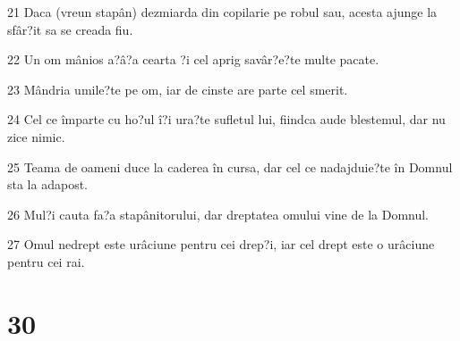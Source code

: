 \par 21 Daca (vreun stapân) dezmiarda din copilarie pe robul sau, acesta ajunge la sfâr?it sa se creada fiu.
\par 22 Un om mânios a?â?a cearta ?i cel aprig savâr?e?te multe pacate.
\par 23 Mândria umile?te pe om, iar de cinste are parte cel smerit.
\par 24 Cel ce împarte cu ho?ul î?i ura?te sufletul lui, fiindca aude blestemul, dar nu zice nimic.
\par 25 Teama de oameni duce la caderea în cursa, dar cel ce nadajduie?te în Domnul sta la adapost.
\par 26 Mul?i cauta fa?a stapânitorului, dar dreptatea omului vine de la Domnul.
\par 27 Omul nedrept este urâciune pentru cei drep?i, iar cel drept este o urâciune pentru cei rai.

\chapter{30}

